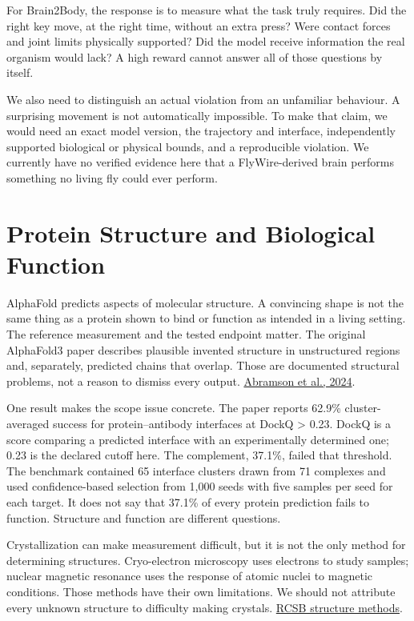 For Brain2Body, the response is to measure what the task truly requires. Did the right key move, at the right time, without an extra press? Were contact forces and joint limits physically supported? Did the model receive information the real organism would lack? A high reward cannot answer all of those questions by itself.\par

We also need to distinguish an actual violation from an unfamiliar behaviour. A surprising movement is not automatically impossible. To make that claim, we would need an exact model version, the trajectory and interface, independently supported biological or physical bounds, and a reproducible violation. We currently have no verified evidence here that a FlyWire-derived brain performs something no living fly could ever perform.\par

\section{Protein Structure and Biological Function}

AlphaFold predicts aspects of molecular structure. A convincing shape is not the same thing as a protein shown to bind or function as intended in a living setting. The reference measurement and the tested endpoint matter. The original AlphaFold3 paper describes plausible invented structure in unstructured regions and, separately, predicted chains that overlap. Those are documented structural problems, not a reason to dismiss every output. \href{https://www.nature.com/articles/s41586-024-07487-w}{Abramson et al., 2024}.\par

One result makes the scope issue concrete. The paper reports 62.9\% cluster-averaged success for protein--antibody interfaces at DockQ > 0.23. DockQ is a score comparing a predicted interface with an experimentally determined one; 0.23 is the declared cutoff here. The complement, 37.1\%, failed that threshold. The benchmark contained 65 interface clusters drawn from 71 complexes and used confidence-based selection from 1,000 seeds with five samples per seed for each target. It does not say that 37.1\% of every protein prediction fails to function. Structure and function are different questions.\par

Crystallization can make measurement difficult, but it is not the only method for determining structures. Cryo-electron microscopy uses electrons to study samples; nuclear magnetic resonance uses the response of atomic nuclei to magnetic conditions. Those methods have their own limitations. We should not attribute every unknown structure to difficulty making crystals. \href{https://pdb101.rcsb.org/learn/guide-to-understanding-pdb-data/methods-for-determining-structure}{RCSB structure methods}.\par

